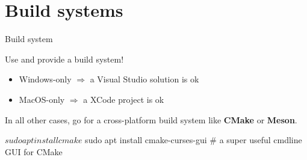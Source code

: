 \documentclass[compress]{beamer}
\begin{document}
%
%
%
%



\section{Build systems}

\begin{frame}[fragile, label=cmake]{Build system}

    Use and provide a build system!

    \begin{itemize}
        \item Windows-only $\Rightarrow$ a Visual Studio solution is ok
        \item MacOS-only $\Rightarrow$ a XCode project is ok
    \end{itemize}

    In all other cases, go for a cross-platform build system like {\bf
    CMake} or {\bf Meson}.

\begin{shcode}
$ sudo apt install cmake
$ sudo apt install cmake-curses-gui # a super useful cmdline GUI for CMake
\end{shcode}


\end{frame}
\end{document}
